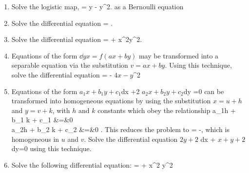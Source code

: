 \documentclass[12pt]{article}
\begin{document}
\begin{enumerate}
\item 
Solve the logistic map,
\bee
{} = y - y^2.
\eee
as a Bernoulli equation

\item
Solve the differential equation
\bee
{} = .
\eee
{}

\item
Solve the differential equation
\bee
{} =  + x^2y^2.
\eee
{}

\item
  Equations of the form $\dd{y}{x} = f(ax+by)$ may be transformed into a 
  separable equation via the substitution  $v=ax + by$. Using this technique,
  solve the differential equation
  \bee 
   = - \(4x -y\)^2
  \eee

\item
  Equations of the form
  \bee
  \(a_1 x + b_1 y + c_1\)dx +2 \(a_2 x + b_2 y + c_2\)dy =0
  \eee
  can be transformed into homogeneous equations by using the substitution
  $x=u+h$ and $y=v+k$, with $h$ and $k$ constants which obey the relationship
  \bee
  a_1h + b_1 k + c_1 &=&0 \\ 
  a_2h + b_2 k + c_2 &=&0 .
  \eee
  This reduces the problem to 
  \bee
   = -,
  \eee
  which is homogeneous in $u$ and $v$.
  Solve the differential equation
  \bee
  \(2y + 2\) dx + \(x +y+2\) dy=0
  \eee
  using this technique.
  

  
  \item
    Solve the following differential equation:
    \be
     =  + x^2 y^2
    \ee

\end{enumerate}
\end{document}
